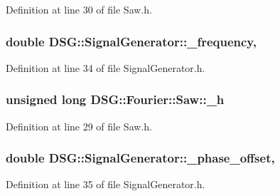 Definition at line 30 of file Saw.\-h.

\hypertarget{classDSG_1_1SignalGenerator_a67e296e3506dcdf09402c667cddff9ac}{
\subsubsection[{\-\_\-frequency}]{\setlength{\rightskip}{0pt plus 5cm}double D\-S\-G\-::\-Signal\-Generator\-::\-\_\-frequency\hspace{0.3cm}{\ttfamily [protected]}, {\ttfamily [inherited]}}}\label{classDSG_1_1SignalGenerator_a67e296e3506dcdf09402c667cddff9ac}


Definition at line 34 of file Signal\-Generator.\-h.

\hypertarget{classDSG_1_1Fourier_1_1Saw_a1e328725e1b0857c8e8bcb6b852b5cc0}{
\subsubsection[{\-\_\-h}]{\setlength{\rightskip}{0pt plus 5cm}unsigned long D\-S\-G\-::\-Fourier\-::\-Saw\-::\-\_\-h\hspace{0.3cm}{\ttfamily [protected]}}}\label{classDSG_1_1Fourier_1_1Saw_a1e328725e1b0857c8e8bcb6b852b5cc0}


Definition at line 29 of file Saw.\-h.

\hypertarget{classDSG_1_1SignalGenerator_a9abf9d00c798e0fdca6314f17547758a}{
\subsubsection[{\-\_\-phase\-\_\-offset}]{\setlength{\rightskip}{0pt plus 5cm}double D\-S\-G\-::\-Signal\-Generator\-::\-\_\-phase\-\_\-offset\hspace{0.3cm}{\ttfamily [protected]}, {\ttfamily [inherited]}}}\label{classDSG_1_1SignalGenerator_a9abf9d00c798e0fdca6314f17547758a}


Definition at line 35 of file Signal\-Generator.\-h.


